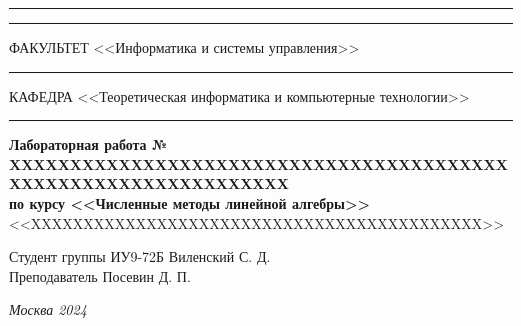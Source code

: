 \documentclass[a4paper, 14pt]{extarticle}
\begin{document}
\begin{titlepage}
\vspace{-25pt}
\hspace{-35pt}\rule{\textwidth}{2.3pt}

\vspace*{-20.3pt}
\hspace{-35pt}\rule{\textwidth}{0.4pt}

\vspace{1.5ex}
\hspace{-35pt} \noindent \small ФАКУЛЬТЕТ\hspace{80pt} <<Информатика и системы управления>>

\vspace*{-16pt}
\hspace{47pt}\rule{0.83\textwidth}{0.4pt}

\vspace{0.5ex}
\hspace{-35pt} \noindent \small КАФЕДРА\hspace{50pt} <<Теоретическая информатика и компьютерные технологии>>

\vspace*{-16pt}
\hspace{30pt}\rule{0.866\textwidth}{0.4pt}
  
\vspace{11em}

\begin{center}
\Large {\bf Лабораторная работа № XXXXXXXXXXXXXXXXXXXXXXXXXXXXXXXXXXXXXXXXXXXXXXXXXXXXXXXXXXXXXXXX} \\ 
\large {\bf по курсу <<Численные методы линейной алгебры>>} \\
\large <<XXXXXXXXXXXXXXXXXXXXXXXXXXXXXXXXXXXXXXXXXXX>> 
\end{center}\normalsize

\vspace{8em}


\begin{flushright}
  {Студент группы ИУ9-72Б Виленский С. Д. \hspace*{15pt}\\ 
  \vspace{2ex}
  Преподаватель Посевин Д. П.\hspace*{15pt}}
\end{flushright}

\bigskip

\vfill
 

\begin{center}
\textsl{Москва 2024}
\end{center}
\end{titlepage}
\end{document}
